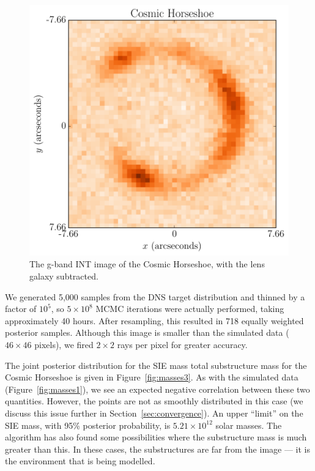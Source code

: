 \documentclass[useAMS,usenatbib]{mn2e}
\newcommand{\revisions}{\color{blue}}
\begin{document}
\begin{figure}
\begin{center}
\includegraphics[scale=0.5]{image3.pdf}
\caption{The g-band INT image of the Cosmic Horseshoe, with the lens galaxy
subtracted.
\label{fig:image3}}
\end{center}
\end{figure}

We generated 5,000 samples from the DNS target distribution and thinned
by a factor of $10^5$, so $5 \times 10^8$ MCMC iterations were actually
performed, taking approximately 40 hours. After resampling, this resulted in
{\revisions 718}
equally weighted posterior samples. Although this image is smaller than the
simulated data ($46 \times 46$ pixels), we fired $2 \times 2$ rays per pixel
for greater accuracy.

The joint posterior distribution for the SIE mass total substructure mass
for the Cosmic Horseshoe is given in Figure~\ref{fig:masses3}. As with
the simulated data (Figure~\ref{fig:masses1}), we see an expected negative
correlation between these two quantities. However, the points are not as
smoothly distributed in this case (we discuss this issue further
in Section~\ref{sec:convergence}). An upper ``limit'' on the SIE mass, with
95\% posterior probability, is $5.21 \times 10^{12}$ solar masses.
The algorithm has also found
some possibilities where the substructure mass is much greater than this. In
these cases, the substructures are far from the image --- it is the environment
that is being modelled.
\end{document}

